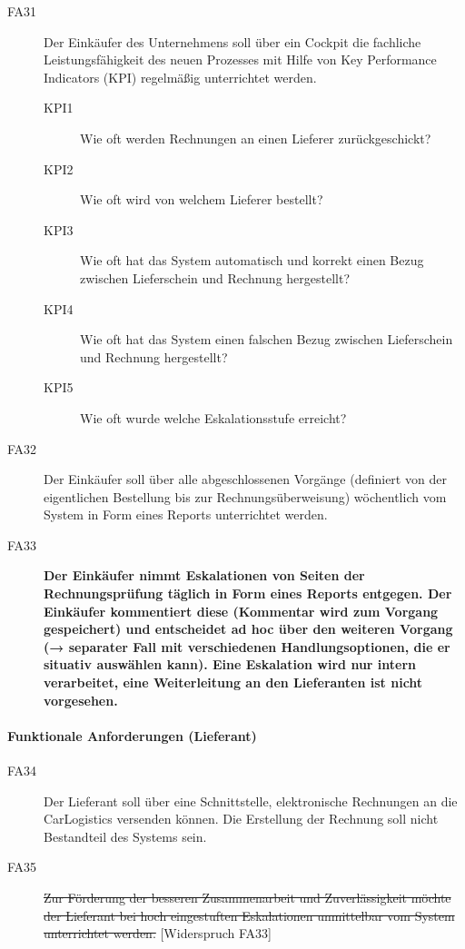 \begin{description}
  \item[FA31] Der Einkäufer des Unternehmens soll über ein Cockpit die fachliche Leistungsfähigkeit des neuen Prozesses mit Hilfe von Key Performance Indicators (KPI) regelmäßig unterrichtet werden.
  \begin{description}
    \item[KPI1] Wie oft werden Rechnungen an einen Lieferer zurückgeschickt?
    \item[KPI2] Wie oft wird von welchem Lieferer bestellt?
    \item[KPI3] Wie oft hat das System automatisch und korrekt einen Bezug zwischen Lieferschein und Rechnung hergestellt?
    \item[KPI4] Wie oft hat das System einen falschen Bezug zwischen Lieferschein und Rechnung hergestellt?
    \item[KPI5] Wie oft wurde welche Eskalationsstufe erreicht?
  \end{description}
  \item[FA32] Der Einkäufer soll über alle abgeschlossenen Vorgänge (definiert von der eigentlichen Bestellung bis zur Rechnungsüberweisung) wöchentlich vom System in Form eines Reports unterrichtet werden.
  \item[FA33] \textbf{Der Einkäufer nimmt Eskalationen von Seiten der Rechnungsprüfung täglich in Form eines Reports entgegen. Der Einkäufer kommentiert diese (Kommentar wird zum Vorgang gespeichert) und entscheidet ad hoc über den weiteren Vorgang (→ separater Fall mit verschiedenen Handlungsoptionen, die er situativ auswählen kann). Eine Eskalation wird nur intern verarbeitet, eine Weiterleitung an den Lieferanten ist nicht vorgesehen.}
\end{description}

\paragraph{Funktionale Anforderungen (Lieferant)}

\begin{description}
  \item[FA34] Der Lieferant soll über eine Schnittstelle, elektronische Rechnungen an die CarLogistics versenden können. Die Erstellung der Rechnung soll nicht Bestandteil des Systems sein.
  \item[FA35] \sout{Zur Förderung der besseren Zusammenarbeit und Zuverlässigkeit möchte der Lieferant bei hoch eingestuften Eskalationen unmittelbar vom System unterrichtet werden.} [Widerspruch FA33]
\end{description}

